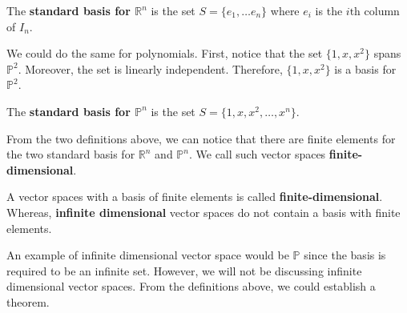 \documentclass[../main.tex]{subfiles}
\begin{document}
\begin{definition}
The \textbf{standard basis for $\mathbb{R}^n$} is the set $S =
\{ e_1, \ldots e_n \}$ where $e_i$ is the $i\text{th}$ column of
$I_n$.
\end{definition}

We could do the same for polynomials. First, notice that the set
$\{ 1, x, x^2 \}$ spans $\mathbb{P}^2$. Moreover, the set is linearly
independent. Therefore, $\{ 1, x, x^2 \}$ is a basis for
$\mathbb{P}^2$.

\begin{definition}
The \textbf{standard basis for $\mathbb{P}^n$} is the set $S =
\{ 1, x, x^2, \ldots, x^n \}$.
\end{definition}

From the two definitions above, we can notice that there are finite
elements for the two standard basis for $\mathbb{R}^n$ and
$\mathbb{P}^n$. We call such vector spaces
\textbf{finite-dimensional}.

\begin{definition}
A vector spaces with a basis of finite elements is called
\textbf{finite-dimensional}. Whereas, \textbf{infinite dimensional}
vector spaces do not contain a basis with finite elements.
\end{definition}

An example of infinite dimensional vector space would be $\mathbb{P}$
since the basis is required to be an infinite set. However, we will
not be discussing infinite dimensional vector spaces. From the
definitions above, we could establish a theorem.
\end{document}
